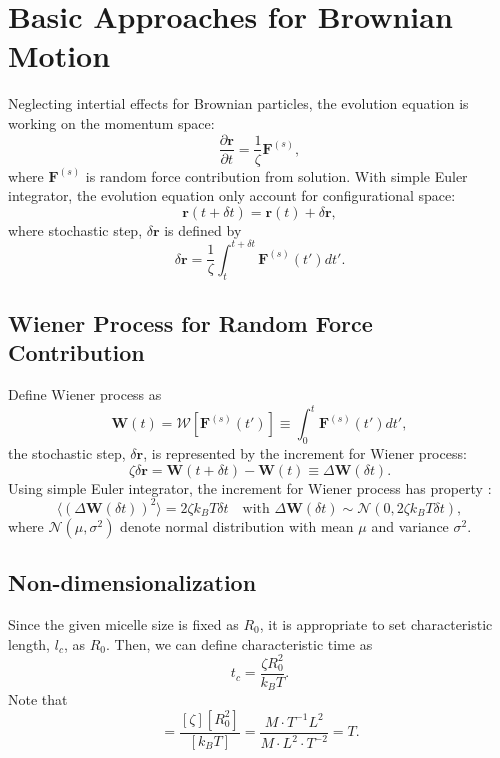 \message{ !name(brief_Brownian_dynamics.tex)}\documentclass[10pt, a4paper]{report}
\begin{document}
\chapter{Basic Approaches for Brownian Motion}
Neglecting intertial effects for Brownian particles, the evolution equation is working on the momentum space:
\begin{equation}
  \frac{\partial \mathbf{r}}{\partial t} = \frac{1}{\zeta}\mathbf{F}^{(s)},\label{eq:evolution_Brownian}
\end{equation}
where $\mathbf{F}^{(s)}$ is random force contribution from solution. With simple Euler integrator, the evolution equation only account for configurational space:
\begin{equation}
\mathbf{r}(t + \delta t) = \mathbf{r}(t) + \delta \mathbf{r},\label{eq:simple_Euler_Brownian}
\end{equation}
where stochastic step, $\delta \mathbf{r}$ is defined by
\begin{equation}
\delta \mathbf{r} = \frac{1}{\zeta}\int_t^{t+\delta t}\mathbf{F}^{(s)}(t')dt'.\label{eq:stochastic_step}
\end{equation}


\section{Wiener Process for Random Force Contribution}

Define Wiener process as
\begin{equation}
\mathbf{W}(t) = \mathscr{W}\left[\mathbf{F}^{(s)}(t')\right] \equiv \int_0^{t} \mathbf{F}^{(s)}(t')dt',
\end{equation}
the stochastic step, $\delta \mathbf{r}$, is represented by the increment for Wiener process:
\begin{equation}
\zeta \delta \mathbf{r} = \mathbf{W}(t+\delta t) - \mathbf{W}(t) \equiv \Delta \mathbf{W}(\delta t).
\end{equation}
Using simple Euler integrator, the increment for Wiener process has property \parencite{GREINER:1988cq}:
\begin{equation}
\langle (\Delta\mathbf{W}(\delta t))^2 \rangle = 2\zeta k_BT \delta t\quad\textrm{with }\Delta \mathbf{W}(\delta t) \sim \mathscr{N}(0, 2\zeta k_BT\delta t),\label{eq:increment_Wiener_process}
\end{equation}
where $\mathscr{N}(\mu, \sigma^2)$ denote normal distribution with mean $\mu$ and variance $\sigma^2$.


\section{Non-dimensionalization}
Since the given micelle size is fixed as $R_0$, it is appropriate to set characteristic length, $l_c$, as $R_0$. Then, we can define characteristic time as
\begin{equation}
t_c = \frac{\zeta R_0^2}{k_BT}.\label{eq:characteristic_time}
\end{equation}
Note that
\begin{equation}
[t_c] = \frac{[\zeta][R_0^2]}{[k_BT]} = \frac{M\cdot T^{-1} L^2}{M\cdot L^2\cdot T^{-2}} = T.
\end{equation}
\end{document}
